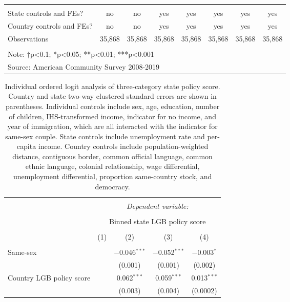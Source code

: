 \documentclass[
  11pt,
]{article}
\begin{document}
\begin{table}[!htbp]
\begin{tabular}{@{\extracolsep{2pt}}lccccccc}
 \hline \\[-1.8ex] 
State controls and FEs? & no & no & yes & yes & yes & yes & yes \\ 
Country controls and FEs? & no & no & yes & yes & yes & yes & yes \\ 
Observations & 35,868 & 35,868 & 35,868 & 35,868 & 35,868 & 35,868 & 35,868 \\ 
\hline 
\hline \\[-1.8ex] 
\multicolumn{8}{l}{Note: †p<0.1; *p<0.05; **p<0.01; ***p<0.001} \\ 
\multicolumn{8}{l}{Source: American Community Survey 2008-2019} \\ 
\end{tabular} 
\end{table}

\begin{table}[!htbp] \centering 
  \caption{Individual ordered logit analysis of three-category state policy score. Country and state two-way clustered standard errors are shown in parentheses. Individual controls include sex, age, education, number of children, IHS-transformed income, indicator for no income, and year of immigration, which are all interacted with the indicator for same-sex couple. State controls include unemployment rate and per-capita income. Country controls include population-weighted distance, contiguous border, common official language, common ethnic language, colonial relationship, wage differential, unemployment differential, proportion same-country stock, and democracy.} 
  \label{tab:ord-full} 
\footnotesize 
\begin{tabular}{@{\extracolsep{5pt}}lcccc} 
\\[-1.8ex]\hline 
\hline \\[-1.8ex] 
 & \multicolumn{4}{c}{\textit{Dependent variable:}} \\ 
\cline{2-5} 
\\[-1.8ex] & \multicolumn{4}{c}{Binned state LGB policy score} \\ 
\\[-1.8ex] & (1) & (2) & (3) & (4)\\ 
\hline \\[-1.8ex] 
 Same-sex &  & $-$0.046$^{***}$ & $-$0.052$^{***}$ & $-$0.003$^{*}$ \\ 
  &  & (0.001) & (0.001) & (0.002) \\ 
  Country LGB policy score &  & 0.062$^{***}$ & 0.059$^{***}$ & 0.013$^{***}$ \\ 
  &  & (0.003) & (0.004) & (0.0002) \\ 

\end{tabular}
\end{table}
\end{document}
